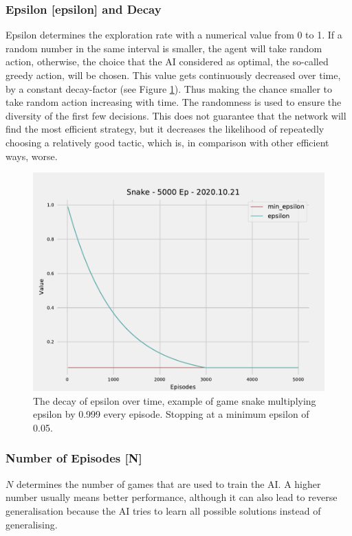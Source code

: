\documentclass[12pt]{article}
\def\epsilon{epsilon}%
\def\({}%
\def\){}%
\begin{document}
\subsubsection{Epsilon [\(\epsilon\)] and Decay}
Epsilon determines the \gls{exploration rate} with a numerical value from 0 to 1. If a random number in the same interval is smaller, the agent will take random action, otherwise, the choice that the \gls{AI} considered as optimal, the so-called \gls{greedy action}, will be chosen. This value gets continuously decreased over time, by a constant decay-factor (see Figure \ref{fig:epsdecay}). Thus making the chance smaller to take random action increasing with time. The randomness is used to ensure the diversity of the first few decisions. This does not guarantee that the network will find the most efficient strategy, but it decreases the likelihood of repeatedly choosing a relatively good tactic, which is, in comparison with other efficient ways, worse.
\begin{figure}[ht]
    \centering
    \includegraphics[width=0.9\linewidth]{pictures/fig.Snake - 5000 Ep - 2020.10.21 (eps).pdf}
    \caption{The decay of epsilon over time, example of game snake multiplying epsilon by 0.999 every episode. Stopping at a minimum epsilon of 0.05.}
    \label{fig:epsdecay}
\end{figure}


\subsubsection{Number of Episodes [\(N\)]}
$N$ determines the number of games that are used to train the \gls{AI}. A higher number usually means better performance, although it can also lead to reverse generalisation because the AI tries to learn all possible solutions instead of generalising.
\end{document}

